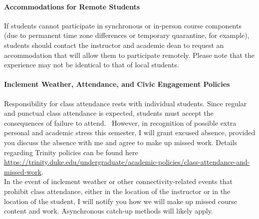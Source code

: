 \documentclass[11pt]{article}
\begin{document}
%

\paragraph{Accommodations for Remote Students}
If students cannot participate in synchronous or in-person course components (due to permanent time zone differences or temporary quarantine, for example), students should contact the instructor and academic dean to request an accommodation that will allow them to participate remotely. Please note that the experience may not be identical to that of local students.\\

\paragraph{Inclement Weather, Attendance, and Civic Engagement Policies}
Responsibility for class attendance rests with individual students. Since regular and punctual class attendance is expected, students must accept the consequences of failure to attend.  However, in recognition of possible extra personal and academic stress this semester, I will grant excused absence, provided you discuss the absence with me and agree to make up missed work. Details regarding Trinity policies can be found here \url{https://trinity.duke.edu/undergraduate/academic-policies/class-attendance-and-missed-work}. \\

In the event of inclement weather or other connectivity-related events that prohibit class attendance, either in the location of the instructor or in the location of the student, I will notify you how we will make up missed course content and work.  Asynchronous catch-up methods will likely apply.\\
\end{document}
